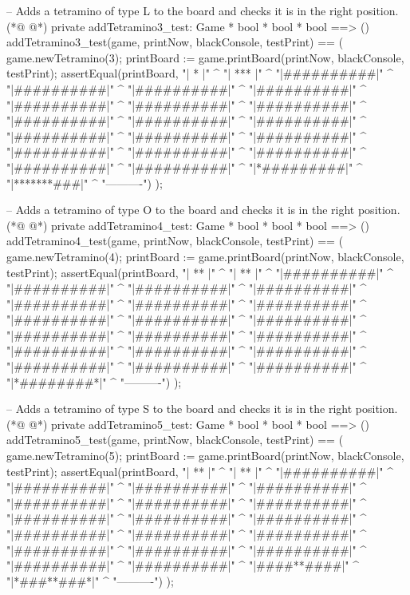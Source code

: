 \begin{vdmpp}[breaklines=true]
  -- Adds a tetramino of type L to the board and checks it is in the right position.
(*@
\label{addTetramino3:test:103}
@*)
  private addTetramino3_test: Game * bool * bool * bool ==> ()
  addTetramino3_test(game, printNow, blackConsole, testPrint) == (  
   game.newTetramino(3);
   printBoard := game.printBoard(printNow, blackConsole, testPrint);
   assertEqual(printBoard, 
    "\n|     *    |" ^
    "\n|   ***    |" ^
    "\n|##########|" ^
    "\n|##########|" ^
    "\n|##########|" ^
    "\n|##########|" ^
    "\n|##########|" ^
    "\n|##########|" ^
    "\n|##########|" ^
    "\n|##########|" ^
    "\n|##########|" ^
    "\n|##########|" ^
    "\n|##########|" ^
    "\n|##########|" ^
    "\n|##########|" ^
    "\n|##########|" ^
    "\n|##########|" ^
    "\n|##########|" ^
    "\n|##########|" ^
    "\n|##########|" ^
    "\n|*#########|" ^
    "\n|*******###|" ^
    "\n ----------")
  );

  -- Adds a tetramino of type O to the board and checks it is in the right position.
(*@
\label{addTetramino4:test:134}
@*)
  private addTetramino4_test: Game * bool * bool * bool ==> ()
  addTetramino4_test(game, printNow, blackConsole, testPrint) == (  
   game.newTetramino(4);
   printBoard := game.printBoard(printNow, blackConsole, testPrint);
   assertEqual(printBoard, 
    "\n|    **    |" ^
    "\n|    **    |" ^
    "\n|##########|" ^
    "\n|##########|" ^
    "\n|##########|" ^
    "\n|##########|" ^
    "\n|##########|" ^
    "\n|##########|" ^
    "\n|##########|" ^
    "\n|##########|" ^
    "\n|##########|" ^
    "\n|##########|" ^
    "\n|##########|" ^
    "\n|##########|" ^
    "\n|##########|" ^
    "\n|##########|" ^
    "\n|##########|" ^
    "\n|##########|" ^
    "\n|##########|" ^
    "\n|##########|" ^
    "\n|##########|" ^
    "\n|*########*|" ^
    "\n ----------")
  );

  -- Adds a tetramino of type S to the board and checks it is in the right position.
(*@
\label{addTetramino5:test:165}
@*)
  private addTetramino5_test: Game * bool * bool * bool ==> ()
  addTetramino5_test(game, printNow, blackConsole, testPrint) == (  
   game.newTetramino(5);
   printBoard := game.printBoard(printNow, blackConsole, testPrint);
   assertEqual(printBoard, 
    "\n|    **    |" ^
    "\n|   **     |" ^
    "\n|##########|" ^
    "\n|##########|" ^
    "\n|##########|" ^
    "\n|##########|" ^
    "\n|##########|" ^
    "\n|##########|" ^
    "\n|##########|" ^
    "\n|##########|" ^
    "\n|##########|" ^
    "\n|##########|" ^
    "\n|##########|" ^
    "\n|##########|" ^
    "\n|##########|" ^
    "\n|##########|" ^
    "\n|##########|" ^
    "\n|##########|" ^
    "\n|##########|" ^
    "\n|##########|" ^
    "\n|####**####|" ^
    "\n|*###**###*|" ^
    "\n ----------")
  );


\end{vdmpp}
